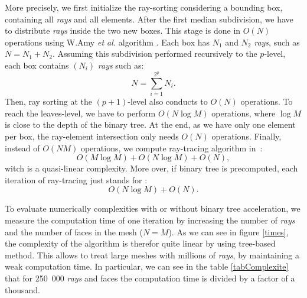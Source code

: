 \documentclass[AMA,STIX1COL]{WileyNJD-v2}
\begin{document}
More precisely, we first initialize the ray-sorting considering a bounding box, containing all \textit{rays} and all elements. After the first median subdivision, we have to distribute \textit{rays} inside the two new boxes. This stage is done in $O(N)$ operations using W.Amy \textit{et al.} algorithm \cite{AABB}. Each box has $N_1$ and $N_2$ \textit{rays}, such as $N = N_1 + N_2$. Assuming this subdivision performed recursively to the $p$-level, each box contains $(N_i)$ \textit{rays} such as: 
\begin{equation}
N = \sum_{i=1}^{2^p} N_i.
\end{equation}  
Then, ray sorting at the $(p+1)$-level also conducts to $O(N)$ operations. To reach the leaves-level, we have to perform $O(N \log M)$ operations, where $\log M$ is close to the depth of the binary tree. At the end, as we have only one element per box, the ray-element intersection only needs $O(N)$ operations. Finally, instead of $O(N M)$ operations, we compute ray-tracing algorithm in~: 
\begin{equation}
O(M\log M) + O(N \log M) + O(N),
\end{equation}  
witch is a quasi-linear complexity. More over, if binary tree is precomputed, each iteration of ray-tracing just stands for :
\begin{equation}
O(N \log M) + O(N).
\end{equation}
 
To evaluate numerically complexities with or without binary tree acceleration, we measure the computation time of one iteration by increasing the number of \textit{rays} and the number of faces in the mesh ($N=M$). As we can see in figure \ref{times}, the complexity of the algorithm is therefor quite linear by using tree-based method. This allows to treat large meshes with millions of \textit{rays}, by maintaining a weak computation time. In particular, we can see in the table \ref{tabComplexite} that for 250~000 \textit{rays} and faces the computation time is divided by a factor of a thousand. 
\end{document}

